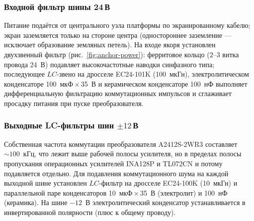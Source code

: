 \documentclass[a4paper,11pt]{article} %
\begin{document}
\subsubsection{Входной фильтр шины 24\,В}

Питание подаётся от центрального узла платформы по экранированному кабелю; экран
заземляется только на стороне центра (одностороннее заземление --- исключает
образование земляных петель). На входе якоря установлен двухзвенный фильтр
(рис.~\ref{fig:anchor-power}): ферритовое кольцо ($2$--$3$ витка провода 24~В)
подавляет высокочастотные наводки синфазного типа; последующее $LC$-звено на дросселе
EC24-101K (100~мкГн), электролитическом конденсаторе 100~мкФ\,$\times$\,35~В и
керамическом конденсаторе 100~нФ выполняет дифференциальную фильтрацию коммутационных
импульсов и сглаживает просадку питания при пуске преобразователя.

\subsubsection{Выходные LC-фильтры шин $\pm 12$\,В}

Собственная частота коммутации преобразователя A2412S-2WR3 составляет ${\sim}100$~кГц,
что лежит выше рабочей полосы усилителя, но в пределах полосы пропускания операционных
усилителей INA128P и TL072CN и потому подавляется отдельно. Для подавления коммутационного
шума на каждой выходной шине установлен $LC$-фильтр на дросселе EC24-100K (10~мкГн)
и параллельной паре конденсаторов 10~мкФ\,$\times$\,35~В (электролит) и 100~нФ (керамика).
На шине $-12$~В электролитический конденсатор устанавливается в инвертированной полярности
(плюс к общему проводу).
\end{document}
